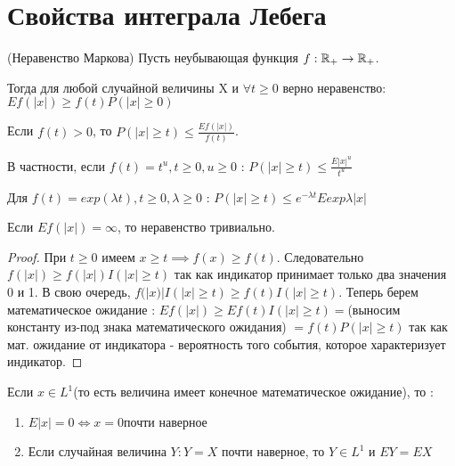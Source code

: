 \section{Свойства интеграла Лебега}
	\begin{theorem}\label{lect8:th1}
		(Неравенство Маркова) 
		Пусть неубывающая функция $f :\mathbb{R}_{+} \to \mathbb{R}_{+}$.
		 
		Тогда для любой случайной величины X и $\forall t \geq 0 $ верно неравенство: $Ef(|x|) \geq f(t)P(|x| \geq 0)$ 
		 
		Если $f(t) > 0$, то	$P(|x|\geq t) \leq \frac{Ef(|x|)}{f(t)}$.
		 
		В частности, если $f(t) = t^u, t \geq 0, u \geq 0$ : $P(|x| \geq t) \leq \frac{E|x|^u}{t^u}$
		 
		Для $f(t) = exp{(\lambda t)}, t \geq 0, \lambda \geq 0$ : $P(|x| \geq t) \leq e^{-\lambda t}E exp{\lambda|x|}$ 
		 
		Если $Ef(|x|) = \infty$, то неравенство тривиально.
	\end{theorem}
	\begin{proof}
		При $t \geq 0$ имеем $x \geq t \implies f(x) \geq f(t)$. 
 		Следовательно $f(|x|) \geq f(|x|) I(|x| \geq t)$ так как индикатор принимает только два значения 0 и 1. В свою очередь, $f(|x)| I(|x| \geq t) \geq f(t) I(|x| \geq t)$. 
 		Теперь берем математическое ожидание : $E f(|x|) \geq E f(t) I(|x| \geq t) = $(выносим константу из-под знака математического ожидания) $= f(t)P(|x| \geq t)$ так как мат. ожидание от индикатора - вероятность того события, которое характеризует индикатор. 
	\end{proof}
	\begin{lemma}\label{lect8:lemma1}
		Если $x \in L^1 $(то есть величина имеет конечное математическое ожидание), то :
		\begin{enumerate}
			\item $E|x|= 0 \iff x = 0 $почти наверное
			\item Если случайная величина $Y : Y = X$ почти наверное, то $Y \in L^1 $ и $EY = EX$
		\end{enumerate}
	\end{lemma}	
